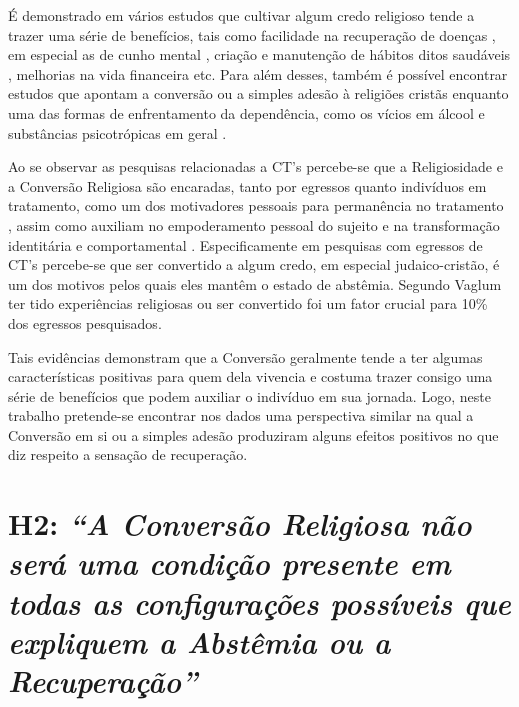 \documentclass[
	12pt,				%
	oneside,			%
	a4paper,			%
	sumario=tradicional,
	english,			%
	brazil				%
	]{abntex2}
\begin{document}
É demonstrado em vários estudos que cultivar algum credo religioso tende a trazer uma série de benefícios, tais como facilidade na recuperação de doenças \autocite{cerqueira-santos_religiao_2004-1}, em especial as de cunho mental \autocite{krause_stress_2011}, criação e manutenção de hábitos ditos saudáveis \autocite{verona_explanations_2011}, melhorias na vida financeira \autocite{mariz_libertacao_1994,potter_growth_2016} etc. Para além desses, também é possível encontrar estudos que apontam a conversão ou a simples adesão à religiões cristãs enquanto uma das formas de enfrentamento da dependência, como os vícios em álcool e substâncias psicotrópicas em geral \autocite{mariz_libertacao_1994,rocha_o_2012-1,smilde_qualitative_2005,targino_os_2016-1}.

Ao se observar as pesquisas relacionadas a CT's percebe-se que a Religiosidade e a Conversão Religiosa são encaradas, tanto por egressos quanto indivíduos em tratamento, como um dos motivadores pessoais para permanência no tratamento \autocites[206]{chu_religious_2012}[367]{shields_religion_2007}, assim como auxiliam no empoderamento pessoal do sujeito e na transformação identitária e comportamental \autocite[327]{targino_comunidades_2017-1}. Especificamente em pesquisas com egressos de CT's percebe-se que ser convertido a algum credo, em especial judaico-cristão, é um dos motivos pelos quais eles mantêm o estado de abstêmia. Segundo Vaglum \autocite*[351]{vaglum_why_1985} ter tido experiências religiosas ou ser convertido foi um fator crucial para 10\% dos egressos pesquisados.

Tais evidências demonstram que a Conversão geralmente tende a ter algumas características positivas para quem dela vivencia e costuma trazer consigo uma série de benefícios que podem auxiliar o indivíduo em sua jornada. Logo, neste trabalho pretende-se encontrar nos dados uma perspectiva similar na qual a Conversão em si ou a simples adesão produziram alguns efeitos positivos no que diz respeito a sensação de recuperação.

\hypertarget{h2-a-conversuxe3o-religiosa-nuxe3o-seruxe1-uma-condiuxe7uxe3o-presente-em-todas-as-configurauxe7uxf5es-possuxedveis-que-expliquem-a-abstuxeamia-ou-a-recuperauxe7uxe3o}{%
\section{\texorpdfstring{\textbf{H2}: \emph{``A Conversão Religiosa não será uma condição presente em todas as configurações possíveis que expliquem a Abstêmia ou a Recuperação''}}{H2: ``A Conversão Religiosa não será uma condição presente em todas as configurações possíveis que expliquem a Abstêmia ou a Recuperação''}}\label{h2-a-conversuxe3o-religiosa-nuxe3o-seruxe1-uma-condiuxe7uxe3o-presente-em-todas-as-configurauxe7uxf5es-possuxedveis-que-expliquem-a-abstuxeamia-ou-a-recuperauxe7uxe3o}}
\end{document}
